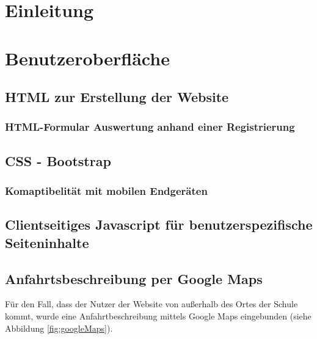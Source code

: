 \chapter{Einleitung}
\label{Einleitung}

\chapter{Benutzeroberfläche}
\label{Benutzeroberfläche}

\section{HTML zur Erstellung der Website}
\label{HTML zur Erstellung der Website}

\subsection{HTML-Formular Auswertung anhand einer Registrierung}
\label{HTML-Formular}

\section{CSS - Bootstrap}
\label{CSS - Bootstrap}

\subsection{Komaptibelität mit mobilen Endgeräten}
\label{Komaptibelität mit mobilen Endgeräten}

\section{Clientseitiges Javascript für benutzerspezifische Seiteninhalte}
\label{Clientseitiges Javascript}

\section{Anfahrtsbeschreibung per Google Maps}
\label{Anfahrtsbeschreibung per Google Maps}
Für den Fall, dass der Nutzer der Website von außerhalb des Ortes der Schule kommt, wurde eine Anfahrtbeschreibung mittels Google Maps eingebunden (siehe Abbildung \vref{fig:googleMaps}).

